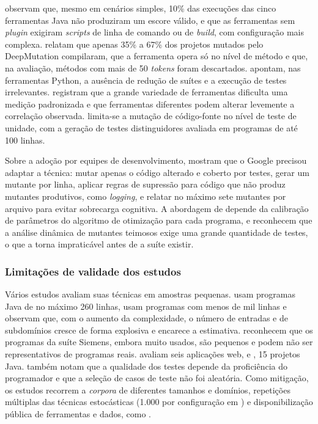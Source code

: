  observam que, mesmo em cenários simples, 10\% das execuções das cinco ferramentas Java não produziram um escore válido, e que as ferramentas sem \textit{plugin} exigiram \textit{scripts} de linha de comando ou de \textit{build}, com configuração mais complexa.  relatam que apenas 35\% a 67\% dos projetos mutados pelo DeepMutation compilaram, que a ferramenta opera só no nível de método e que, na avaliação, métodos com mais de 50 \textit{tokens} foram descartados.  apontam, nas ferramentas Python, a ausência de redução de suítes e a execução de testes irrelevantes.  registram que a grande variedade de ferramentas dificulta uma medição padronizada e que ferramentas diferentes podem alterar levemente a correlação observada.  limita-se a mutação de código-fonte no nível de teste de unidade, com a geração de testes distinguidores avaliada em programas de até 100 linhas.

Sobre a adoção por equipes de desenvolvimento,  mostram que o Google precisou adaptar a técnica: mutar apenas o código alterado e coberto por testes, gerar um mutante por linha, aplicar regras de supressão para código que não produz mutantes produtivos, como \textit{logging}, e relatar no máximo sete mutantes por arquivo para evitar sobrecarga cognitiva. A abordagem de  depende da calibração de parâmetros do algoritmo de otimização para cada programa, e  reconhecem que a análise dinâmica de mutantes teimosos exige uma grande quantidade de testes, o que a torna impraticável antes de a suíte existir.

\subsubsection{Limitações de validade dos estudos}
\label{subsubsec:limitacoes-validade}

Vários estudos avaliam suas técnicas em amostras pequenas.  usam programas Java de no máximo 260 linhas,  usam programas com menos de mil linhas e observam que, com o aumento da complexidade, o número de entradas e de subdomínios cresce de forma explosiva e encarece a estimativa.  reconhecem que os programas da suíte Siemens, embora muito usados, são pequenos e podem não ser representativos de programas reais.  avaliam seis aplicações web, e , 15 projetos Java.  também notam que a qualidade dos testes depende da proficiência do programador e que a seleção de casos de teste não foi aleatória. Como mitigação, os estudos recorrem a \textit{corpora} de diferentes tamanhos e domínios, repetições múltiplas das técnicas estocásticas (1.000 por configuração em ) e disponibilização pública de ferramentas e dados, como .


